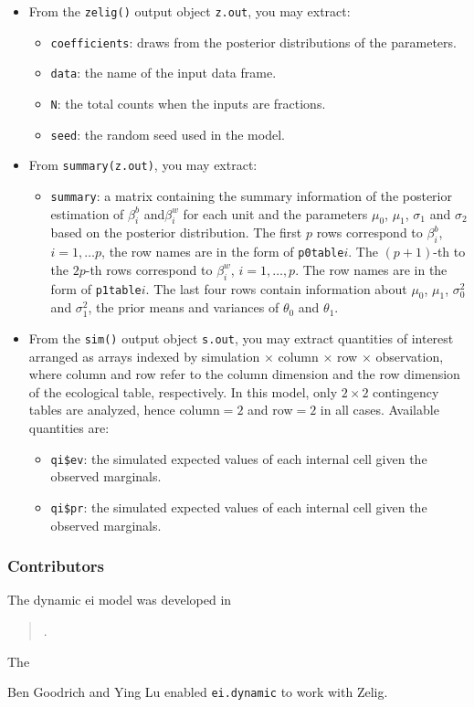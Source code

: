\begin{itemize}
\item From the \texttt{zelig()} output object \texttt{z.out}, 
you may extract:

\begin{itemize}
\item \texttt{coefficients}: draws from the posterior distributions
of the parameters.
\item \texttt{data}: the name of the input data frame.
\item \texttt{N}: the total counts when the inputs are fractions.
\item \texttt{seed}: the random seed used in the model.
\end{itemize}

\item From \texttt{summary(z.out)}, you may extract:
\begin{itemize}
\item \texttt{summary}: a matrix containing the summary information of the 
posterior estimation of $\beta^b_i$ and$\beta^w_i$ for each unit and
the parameters $\mu_0$, $\mu_1$, $\sigma_1$ and $\sigma_2$ based on
the posterior distribution.  The first $p$ rows correspond to
$\beta_i^b$, $i=1,\ldots p$, the row names are in the form of
\texttt{p0table}$i$. The $(p+1)$-th to the $2p$-th rows correspond to
$\beta_i^w$, $i=1,\ldots,p$. The row names are in the form of
\texttt{p1table}$i$. The last four rows contain information about
$\mu_0$, $\mu_1$, $\sigma_0^2$ and $\sigma_1^2$, the prior means and
variances of $\theta_0$ and $\theta_1$. 
\end{itemize}
\item From the \texttt{sim()} output object \texttt{s.out}, you may
extract quantities of interest arranged as arrays indexed by
simulation $\times$ column $\times$ row $\times$ observation, where
column and row refer to the column dimension and the row dimension of
the ecological table, respectively. In this model, only $2 \times 2$
contingency tables are analyzed, hence column$=2$ and row$=2$ in all
cases. Available quantities are:
\begin{itemize}
\item \texttt{qi\$ev}: the simulated expected values of each internal
cell given the observed marginals.
\item \texttt{qi\$pr}: the simulated expected values of each internal
cell given the observed marginals.
\end{itemize}

\end{itemize}

\subsubsection{Contributors}

The dynamic {\sc ei} model was developed in
\begin{verse}
.
\end{verse}
The 

\noindent Ben Goodrich and Ying Lu enabled \texttt{ei.dynamic} to work with Zelig.

